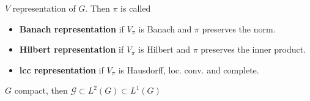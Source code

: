 \begin{definition} $V$ representation of $G$. Then $\pi $ is called
\begin{itemize}[topsep=-6pt, itemsep=0pt]
    \item \textbf{Banach representation} if $V_\pi $ is Banach and $\pi $ preserves the norm.
    \item \textbf{Hilbert representation} if $V_\pi $ is Hilbert and $\pi $ preserves the inner product.
    \item \textbf{lcc representation} if $V_\pi $ is Hausdorff, loc. conv. and complete.
\end{itemize}
\end{definition}

\begin{proposition} $G$ compact, then $\mathcal{G} \subset L^2(G) \subset L^1(G)$ 
\end{proposition}